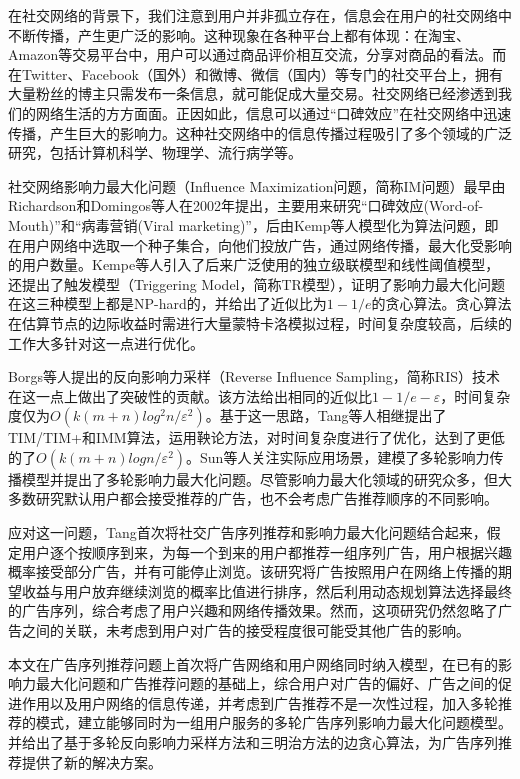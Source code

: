 在社交网络的背景下，我们注意到用户并非孤立存在，信息会在用户的社交网络中不断传播，产生更广泛的影响。这种现象在各种平台上都有体现：在淘宝、Amazon等交易平台中，用户可以通过商品评价相互交流，分享对商品的看法。而在Twitter、Facebook（国外）和微博、微信（国内）等专门的社交平台上，拥有大量粉丝的博主只需发布一条信息，就可能促成大量交易。社交网络已经渗透到我们的网络生活的方方面面。正因如此，信息可以通过“口碑效应”在社交网络中迅速传播，产生巨大的影响力。这种社交网络中的信息传播过程吸引了多个领域的广泛研究，包括计算机科学、物理学、流行病学等\cite{li2018influence}。

社交网络影响力最大化问题（Influence Maximization问题，简称IM问题）最早由Richardson和Domingos等人\cite{richardson2002mining}在2002年提出，主要用来研究“口碑效应(Word-of-Mouth)”和“病毒营销(Viral marketing)”，后由Kemp等人\cite{kempe2003maximizing}模型化为算法问题，即在用户网络中选取一个种子集合，向他们投放广告，通过网络传播，最大化受影响的用户数量。Kempe等人引入了后来广泛使用的独立级联模型\cite{goldenberg2001talk}和线性阈值模型\cite{granovetter1978threshold}，还提出了触发模型（Triggering Model，简称TR模型），证明了影响力最大化问题在这三种模型上都是NP-hard的，并给出了近似比为$1-1/e$的贪心算法。贪心算法在估算节点的边际收益时需进行大量蒙特卡洛模拟过程，时间复杂度较高，后续的工作大多针对这一点进行优化。

Borgs等人\cite{borgs2014maximizing}提出的反向影响力采样（Reverse Influence Sampling，简称RIS）技术在这一点上做出了突破性的贡献。该方法给出相同的近似比$1-1/e-\varepsilon$，时间复杂度仅为$O(k(m+n)log^2n/\varepsilon^2)$。基于这一思路，Tang等人相继提出了TIM/TIM+\cite{tang2014influence}和IMM\cite{tang2015influence}算法，运用鞅论方法，对时间复杂度进行了优化，达到了更低的了$O(k(m+n)logn/\varepsilon^2)$。Sun等人关注实际应用场景，建模了多轮影响力传播模型并提出了多轮影响力最大化问题\cite{mrim}。尽管影响力最大化领域的研究众多，但大多数研究默认用户都会接受推荐的广告，也不会考虑广告推荐顺序的不同影响。

应对这一问题，Tang\cite{tang2018social}首次将社交广告序列推荐和影响力最大化问题结合起来，假定用户逐个按顺序到来，为每一个到来的用户都推荐一组序列广告，用户根据兴趣概率接受部分广告，并有可能停止浏览。该研究将广告按照用户在网络上传播的期望收益与用户放弃继续浏览的概率比值进行排序，然后利用动态规划算法选择最终的广告序列，综合考虑了用户兴趣和网络传播效果。然而，这项研究仍然忽略了广告之间的关联，未考虑到用户对广告的接受程度很可能受其他广告的影响。

本文在广告序列推荐问题上首次将广告网络和用户网络同时纳入模型，在已有的影响力最大化问题和广告推荐问题的基础上，综合用户对广告的偏好、广告之间的促进作用以及用户网络的信息传递，并考虑到广告推荐不是一次性过程，加入多轮推荐的模式，建立能够同时为一组用户服务的多轮广告序列影响力最大化问题模型。并给出了基于多轮反向影响力采样方法和三明治方法的边贪心算法，为广告序列推荐提供了新的解决方案。

